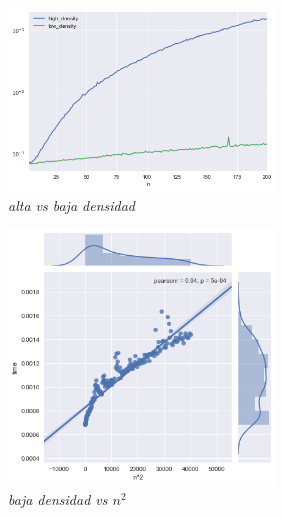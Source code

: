 \begin{figure}[!htb!]
	\begin{center}
		\includegraphics[width=200pt]{Imagenes/high_vs_low_density.png}
		\caption{{\small \textit{alta vs baja densidad}}}
	\end{center}
\end{figure}

\begin{figure}[!htb!]
	\begin{center}
		\includegraphics[width=200pt]{Imagenes/low_density_vs_n2.png}
		\caption{{\small \textit{baja densidad vs $n^{2}$}}}
	\end{center}
\end{figure}
\pagebreak




